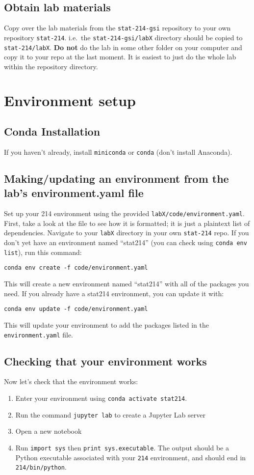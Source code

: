 \documentclass[letterpaper,12pt]{article}
\begin{document}
\subsection{Obtain lab materials}
Copy over the lab materials from the \texttt{stat-214-gsi} repository to your own repository \texttt{stat-214}. i.e.~the \texttt{stat-214-gsi/labX} directory should be copied to \texttt{stat-214/labX}. \textbf{Do not} do the lab in some other folder on your computer and copy it to your repo at the last moment. It is easiest to just do the whole lab within the repository directory.

\section{Environment setup}

\subsection{Conda Installation}
If you haven't already, install \texttt{miniconda} or \texttt{conda} (don't install Anaconda).

\subsection{Making/updating an environment from the lab's environment.yaml file}
Set up your 214 environment using the provided \texttt{labX/code/environment.yaml}. First, take a look at the file to see how it is formatted; it is just a plaintext list of dependencies. Navigate to your \texttt{labX} directory in your own \texttt{stat-214} repo. If you don't yet have an environment named ``stat214'' (you can check using \texttt{conda env list}), run this command:
\begin{verbatim}
conda env create -f code/environment.yaml
\end{verbatim}
This will create a new environment named ``stat214'' with all of the packages you need. If you already have a stat214 environment, you can update it with:
\begin{verbatim}
conda env update -f code/environment.yaml
\end{verbatim}
This will update your environment to add the packages listed in the \texttt{environment.yaml} file.

\subsection{Checking that your environment works}
Now let's check that the environment works:
\begin{enumerate}
    \item Enter your environment using \texttt{conda activate stat214}.
    \item Run the command \texttt{jupyter lab} to create a Jupyter Lab server
    \item Open a new notebook
    \item Run \texttt{import sys} then \texttt{print sys.executable}. The output should be a Python executable associated with your \texttt{214} environment, and should end in \texttt{214/bin/python}.
\end{enumerate}
\end{document}
